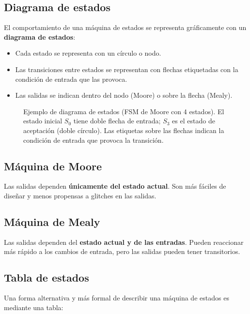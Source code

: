 \subsection{Diagrama de estados}

El comportamiento de una máquina de estados se representa gráficamente con un \textbf{diagrama de estados}:

\begin{itemize}
    \item Cada estado se representa con un círculo o nodo.
    \item Las transiciones entre estados se representan con flechas etiquetadas con la condición de entrada que las provoca.
    \item Las salidas se indican dentro del nodo (Moore) o sobre la flecha (Mealy).
\end{itemize}

\begin{figure}[H]
\centering

\caption{Ejemplo de diagrama de estados (FSM de Moore con 4 estados).
  El estado inicial $S_0$ tiene doble flecha de entrada; $S_3$ es el estado
  de aceptación (doble círculo). Las etiquetas sobre las flechas indican la
  condición de entrada que provoca la transición.}
\end{figure}

\subsection{Máquina de Moore}

Las salidas dependen \textbf{únicamente del estado actual}. Son más fáciles de diseñar y menos propensas a glitches en las salidas.

\subsection{Máquina de Mealy}

Las salidas dependen del \textbf{estado actual y de las entradas}. Pueden reaccionar más rápido a los cambios de entrada, pero las salidas pueden tener transitorios.

\subsection{Tabla de estados}

Una forma alternativa y más formal de describir una máquina de estados es mediante una tabla:

